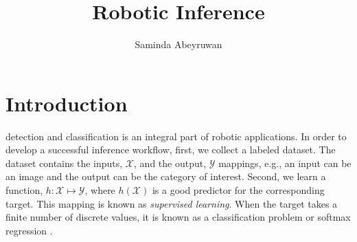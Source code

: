 \documentclass[10pt,journal,compsoc]{IEEEtran}
\begin{document}
\title{Robotic Inference}

\author{Saminda Abeyruwan}

%
{}


\maketitle
\IEEEdisplaynontitleabstractindextext
\IEEEpeerreviewmaketitle
\section{Introduction}
\label{sec:introduction}

 detection and classification is an integral part of robotic applications. In order to develop a successful inference workflow,  first, we collect a labeled dataset. The dataset contains the inputs, $\mathcal{X}$, and the output, $\mathcal{Y}$ mappings, e.g., an input can be an image and the output can be the category of interest. Second, we learn a function, $h: \mathcal{X} \mapsto \mathcal{Y}$, where $h(\mathcal{X})$ is a good predictor for the corresponding target. This mapping is known as \textit{supervised learning}.  When the target takes a finite number of discrete values, it is known as a classification problem or softmax regression \cite{Bishop:2006:PRM:1162264}. 
\end{document}
